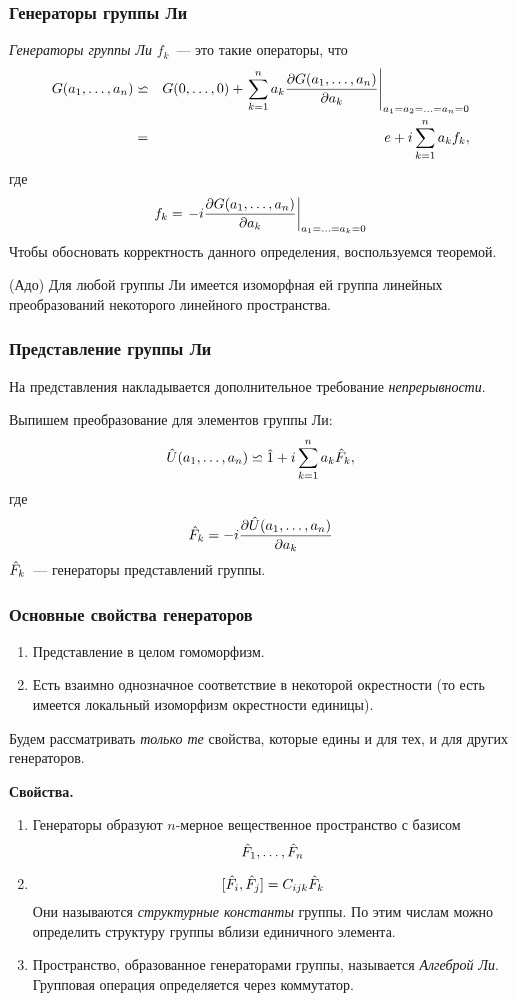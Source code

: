 \subsubsection{Генераторы группы Ли}
\Def \emph{Генераторы группы Ли} $f_k$~--- это такие операторы, что
\begin{eqnarray*}
    G(a_1, \ldots, a_n) &\backsimeq& G(0, \ldots, 0) + \left.\sum_{k=1}^{n} a_k \dfrac{\partial G(a_1, \ldots, a_n)}{\partial a_k}
    \right|_{a_1 = a_2 = \ldots = a_n = 0}\\
    &=& e + i \sum_{k=1}^{n} a_k f_k,
\end{eqnarray*}
где
$$
    f_k = \left.-i \dfrac{\partial G(a_1, \ldots, a_n)}{\partial a_k}\right|_{a_1 = \ldots = a_k = 0}
$$
Чтобы обосновать корректность данного определения, воспользуемся теоремой.

\Th (Адо)
Для любой группы Ли имеется изоморфная ей группа линейных преобразований некоторого линейного пространства.

\subsubsection{Представление группы Ли}
На представления накладывается дополнительное требование \emph{непрерывности}.

Выпишем \infze преобразование для элементов группы Ли:
$$
    \Hat U(a_1, \ldots, a_n) \backsimeq \Hat 1 + i \sum_{k=1}^{n} a_k \hat F_k,
$$
где
$$
    \Hat F_k = -i \dfrac{\partial \Hat U(a_1, \ldots, a_n)}{\partial a_k}
$$
$\Hat F_k$~--- генераторы представлений группы.

\subsubsection{Основные свойства генераторов}
\begin{enumerate}
  \item Представление в целом гомоморфизм.
  \item Есть взаимно однозначное соответствие в некоторой окрестности (то есть имеется локальный изоморфизм окрестности единицы).
\end{enumerate}
Будем рассматривать \emph{только те} свойства, которые едины и для тех, и для других генераторов.

\textbf{Свойства.}
\begin{enumerate}
  \item Генераторы образуют $n$-мерное вещественное пространство с базисом
  $$
    \Hat F_1, \ldots, \Hat F_n
  $$
  \item
  $$
    [\Hat F_i, \Hat F_j] = C_{ijk} \Hat F_k
  $$
  Они называются \emph{структурные константы} группы. По этим числам можно определить структуру группы вблизи единичного элемента.
  \item Пространство, образованное генераторами группы, называется \emph{Алгеброй Ли}. Групповая операция определяется через коммутатор.    
\end{enumerate}
